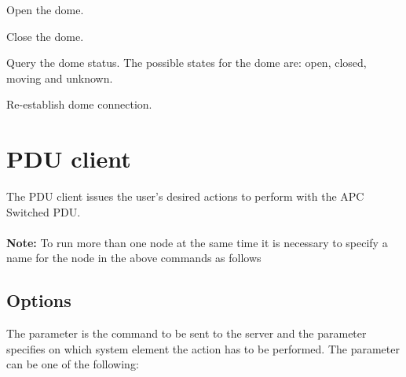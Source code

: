 \documentclass[a4paper,english]{article}
\begin{document}
\begin{Description}\setlength{\itemsep}{0cm}
\item[\Arg{open}] Open the dome. 

	   
	
\item[\Arg{close}] Close the dome.

	   
	
\item[\Arg{status}] Query the dome status. The possible states for the dome are: open, closed, moving and unknown.

	   
	
\item[\Arg{reconnect}] Re-establish dome connection.

	   
	
\end{Description}

\section{PDU client}

The PDU client issues the user's desired actions to perform with the APC Switched PDU. \\

    \\

\textbf{Note:} To run more than one  node at the same time it is necessary to specify a name for the node in the above commands as follows 

\subsection{Options}

The  parameter is the command to be sent to the server and the  parameter specifies on which system element the action has to be performed. The  parameter can be one of the following:
\end{document}
